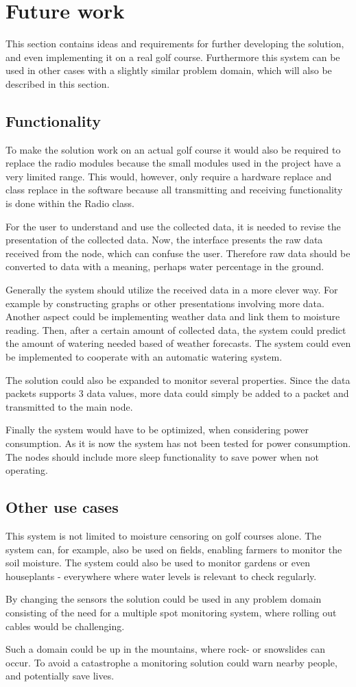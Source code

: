 \section{Future work}
This section contains ideas and requirements for further developing the solution, and even implementing it on a real golf course. Furthermore this system can be used in other cases with a slightly similar problem domain, which will also be described in this section.

\subsection{Functionality}
To make the solution work on an actual golf course it would also be required to replace the radio modules because the small modules used in the project have a very limited range. This would, however, only require a hardware replace and class replace in the software because all transmitting and receiving functionality is done within the Radio class.

For the user to understand and use the collected data, it is needed to revise the presentation of the collected data. Now, the interface presents the raw data received from the node, which can confuse the user. Therefore raw data should be converted to data with a meaning, perhaps water percentage in the ground.

Generally the system should utilize the received data in a more clever way. For example by constructing graphs or  other presentations involving more data. Another aspect could be implementing weather data and link them to moisture reading. Then, after a certain amount of collected data, the system could predict the amount of watering needed based of weather forecasts. The system could even be implemented to cooperate with an automatic watering system.

The solution could also be expanded to monitor several properties. Since the data packets supports 3 data values, more data could simply be added to a packet and transmitted to the main node.

Finally the system would have to be optimized, when considering power consumption. As it is now the system has not been tested for power consumption. The nodes should include more sleep functionality to save power when not operating.

\subsection{Other use cases}
This system is not limited to moisture censoring on golf courses alone. The system can, for example, also be used on fields, enabling farmers to monitor the soil moisture. The system could also be used to monitor gardens or even houseplants - everywhere where water levels is relevant to check regularly.

By changing the sensors the solution could be used in any problem domain consisting of the need for a multiple spot monitoring system, where rolling out cables would be challenging.

Such a domain could be up in the mountains, where rock- or snowslides can occur. To avoid a catastrophe a monitoring solution could warn nearby people, and potentially save lives.